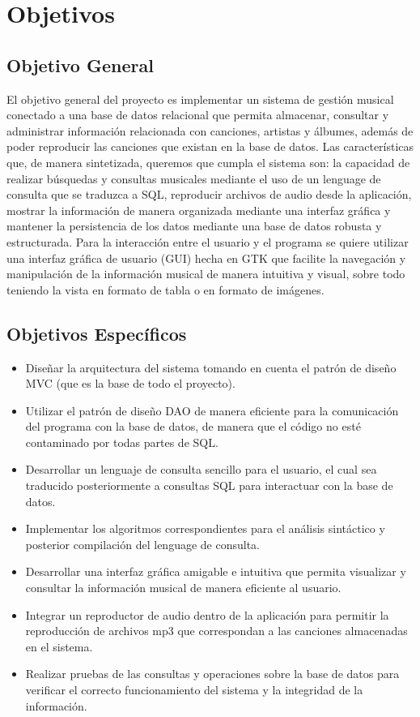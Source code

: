 \documentclass[12pt]{article}
\begin{document}
\section{Objetivos}

\subsection{Objetivo General}
El objetivo general del proyecto es implementar un sistema de gestión musical conectado a una base de datos relacional que permita almacenar, consultar y administrar información relacionada con canciones, artistas y álbumes, además de poder reproducir las canciones que existan en la base de datos. Las características que, de manera sintetizada, queremos que cumpla el sistema son: la capacidad de realizar búsquedas y consultas musicales mediante el uso de un lenguage de consulta que se traduzca a SQL, reproducir archivos de audio desde la aplicación, mostrar la información de manera organizada mediante una interfaz gráfica y mantener la persistencia de los datos mediante una base de datos robusta y estructurada. Para la interacción entre el usuario y el programa se quiere utilizar una interfaz gráfica de usuario (GUI) hecha en GTK que facilite la navegación y manipulación de la información musical de manera intuitiva y visual, sobre todo teniendo la vista en formato de tabla o en formato de imágenes.

\subsection{Objetivos Específicos}
\begin{itemize}
\item Diseñar la arquitectura del sistema tomando en cuenta el patrón de diseño MVC (que es la base de todo el proyecto).
\item Utilizar el patrón de diseño DAO de manera eficiente para la comunicación del programa con la base de datos, de manera que el código no esté contaminado por todas partes de SQL.
\item Desarrollar un lenguaje de consulta sencillo para el usuario, el cual sea traducido posteriormente a consultas SQL para interactuar con la base de datos.
\item Implementar los algoritmos correspondientes para el análisis sintáctico y posterior compilación del lenguage de consulta.
\item Desarrollar una interfaz gráfica amigable e intuitiva que permita visualizar y consultar la información musical de manera eficiente al usuario.
\item Integrar un reproductor de audio dentro de la aplicación para permitir la reproducción de archivos mp3 que correspondan a las canciones almacenadas en el sistema.
\item Realizar pruebas de las consultas y operaciones sobre la base de datos para verificar el correcto funcionamiento del sistema y la integridad de la información.
\end{itemize}
\end{document}

